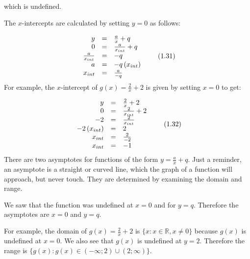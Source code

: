 \label{m39341*id248050}which is undefined.\par 
\label{m39341*id248056}The $x$-intercepts are calculated by setting $y=0$ as follows:\par 
\label{m39341*uid155}\nopagebreak\noindent{}
\begin{equation}
\begin{array}{ccc}\hfill y& =& \frac{a}{x}+q\hfill \\ \hfill 0& =& \frac{a}{{x}_{int}}+q\hfill \\ \hfill \frac{a}{{x}_{int}}& =& -q\hfill \\ \hfill a& =& -q\left({x}_{int}\right)\hfill \\ \hfill {x}_{int}& =& \frac{a}{-q}\hfill \end{array}\tag{1.31}
\end{equation}
\label{m39341*id248264}For example, the $x$-intercept of $g\left(x\right)=\frac{2}{x}+2$ is given by setting $x=0$ to get:\par 
\label{m39341*id248323}\nopagebreak\noindent{}
\begin{equation}
\begin{array}{ccc}\hfill y& =& \frac{2}{x}+2\hfill \\ \hfill 0& =& \frac{2}{{x}_{int}}+2\hfill \\ \hfill -2& =& \frac{2}{{x}_{int}}\hfill \\ \hfill -2\left({x}_{int}\right)& =& 2\hfill \\ \hfill {x}_{int}& =& \frac{2}{-2}\hfill \\ \hfill {x}_{int}& =& -1\hfill \end{array}\tag{1.32}
\end{equation}
\label{m39341*uid156}
\nopagebreak
\label{m39341*id248536}There are two asymptotes for functions of the form $y=\frac{a}{x}+q$. Just a reminder, an asymptote is a straight or curved line, which the graph of a function will approach, but never touch. They are determined by examining the domain and range.\par 
\label{m39341*id248567}We saw that the function was undefined at $x=0$ and for $y=q$. Therefore the asymptotes are $x=0$ and $y=q$.\par 
\label{m39341*id248630}For example, the domain of $g\left(x\right)=\frac{2}{x}+2$ is $\{x:x\in \mathbb{R},x\ne 0\}$ because $g\left(x\right)$ is undefined at $x=0$. We also see that $g\left(x\right)$ is undefined at $y=2$. Therefore the range is $\{g\left(x\right):g\left(x\right)\in \left(-\infty ;2\right)\cup \left(2;\infty \right)\}$.\par 

